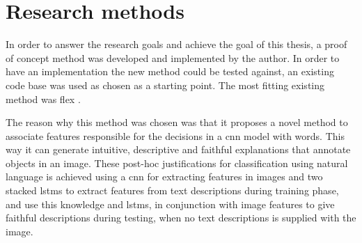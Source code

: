 \label{sec:1_4_research_methods}

\begin{comment}
You are doing a research education, so it might be nice to show that you are aware of different ways of doing research. Here, you should describe your research methods showing the reader that you are conscious of your method. There exist several methodologies, and finding a reference somewhere would probably be good.
\end{comment}

\section{Research methods}

In order to answer the research goals and achieve the goal of this thesis, a proof of concept method was developed and implemented by the author. In order to have an implementation the new method could be tested against, an existing code base was used as chosen as a starting point. The most fitting existing method was \gls{flex} \cite{wickramanayakeFLEXFaithfulLinguistic2019}. 

The reason why this method was chosen was that it proposes a novel method to associate features responsible for the decisions in a \gls{cnn} model with words. This way it can generate intuitive, descriptive and faithful explanations that annotate objects in an image. These post-hoc justifications for classification using natural language is achieved using a \gls{cnn} for extracting features in images and two stacked \glspl{lstm} to extract features from text descriptions during training phase, and use this knowledge and \glspl{lstm}, in conjunction with image features to give faithful descriptions during testing, when no text descriptions is supplied with the image.

